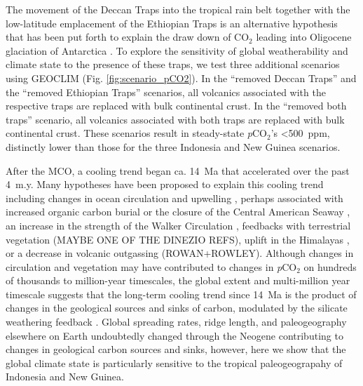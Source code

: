 \documentclass[11pt,letterpaper]{article}
\newcommand{\pCOtwo}{\textit{p}CO$_{2}$\xspace}
\newcommand{\COtwo}{CO$_{2}$\xspace}
\begin{document}
The movement of the Deccan Traps into the tropical rain belt together with the low-latitude emplacement of the Ethiopian Traps is an alternative hypothesis that has been put forth to explain the draw down of \COtwo leading into Oligocene glaciation of Antarctica \citep{Kent2008a, Kent2013a}. To explore the sensitivity of global weatherability and climate state to the presence of these traps, we test three additional scenarios using GEOCLIM (Fig. \ref{fig:scenario_pCO2}). In the ``removed Deccan Traps'' and the ``removed Ethiopian Traps'' scenarios, all volcanics associated with the respective traps are replaced with bulk continental crust. In the ``removed both traps'' scenario, all volcanics associated with both traps are replaced with bulk continental crust. These scenarios result in steady-state \pCOtwo's \textless500~ppm, distinctly lower than those for the three Indonesia and New Guinea scenarios.



After the MCO, a cooling trend began ca. 14~Ma that accelerated over the past 4~m.y. Many hypotheses have been proposed to explain this cooling trend including changes in ocean circulation and upwelling \citep{Shevenell2004a, Holbourn2015a}, perhaps associated with increased organic carbon burial \citep{Vincent1985a, Flower1993a} or the closure of the Central American Seaway \citep{Haug1998a}, an increase in the strength of the Walker Circulation \citep{Molnar2015a}, feedbacks with terrestrial vegetation \citep{Cerling1997a}(MAYBE ONE OF THE DINEZIO REFS), uplift in the Himalayas \citep{Raymo1988a}, or a decrease in volcanic outgassing \citep{Berner1983a}(ROWAN+ROWLEY). Although changes in circulation and vegetation may have contributed to changes in \pCOtwo on hundreds of thousands to million-year timescales, the global extent and multi-million year timescale suggests that the long-term cooling trend since 14~Ma is the product of changes in the geological sources and sinks of carbon, modulated by the silicate weathering feedback \citep{Walker1981a, Raymo1991a, Berner1997a, Kump1997a, Berner2001a}. Global spreading rates, ridge length, and paleogeography elsewhere on Earth undoubtedly changed through the Neogene contributing to changes in geological carbon sources and sinks, however, here we show that the global climate state is particularly sensitive to the tropical paleogeograpahy of Indonesia and New Guinea.
\end{document}
